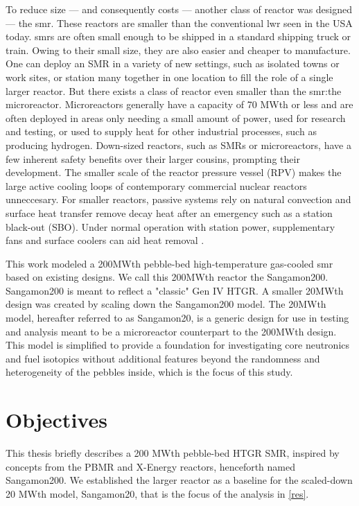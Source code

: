 To reduce size --- and consequently costs --- another class of reactor was designed --- the \acrfull{smr}.  These reactors are smaller than the conventional \acrshort{lwr} seen in the USA today.  \acrshort{smr}s are often small enough to be shipped in a standard shipping truck or train.  Owing to their small size, they are also easier and cheaper to manufacture.  One can deploy an SMR in a variety of new settings, such as isolated towns or work sites, or station many together in one location to fill the role of a single larger reactor.  But there exists a class of reactor even smaller than the \acrshort{smr}:the microreactor.  Microreactors generally have a capacity of 70 MWth or less and are often deployed in areas only needing a small amount of power, used for research and testing, or used to supply heat for other industrial processes, such as producing hydrogen.  Down-sized reactors, such as SMRs or microreactors, have a few inherent safety benefits over their larger cousins, prompting their development.  The smaller scale of the reactor pressure vessel (RPV) makes the large active cooling loops of contemporary commercial nuclear reactors unneccesary.  For smaller reactors, passive systems rely on natural convection and surface heat transfer remove decay heat after an emergency such as a station black-out (SBO).  Under normal operation with station power, supplementary fans and surface coolers can aid heat removal \cite{reutler_advantages_1984}.


This work modeled a 200MWth pebble-bed high-temperature gas-cooled \acrshort{smr} based on existing designs.  We call this 200MWth reactor the Sangamon200.  Sangamon200 is meant to reflect a "classic" Gen IV HTGR.  A smaller 20MWth design was created by scaling down the Sangamon200 model.  The 20MWth model, hereafter referred to as Sangamon20, is a generic design for use in testing and analysis meant to be a microreactor counterpart to the 200MWth design.  This model is simplified to provide a foundation for investigating core neutronics and fuel isotopics without additional features beyond the randomness and heterogeneity of the pebbles inside, which is the focus of this study.


\section{Objectives}

This thesis briefly describes a 200 MWth pebble-bed HTGR SMR, inspired by concepts from the PBMR \cite{venter_pbmr_2005, noauthor_pebble_2017} and X-Energy \cite{harlan_x-energy_2018} reactors, henceforth named Sangamon200.  We established the larger reactor as a baseline for the scaled-down 20 MWth model, Sangamon20, that is the focus of the analysis in \autoref{res}.

